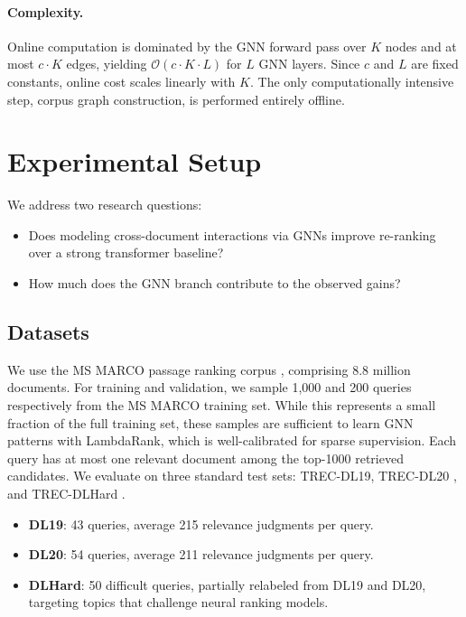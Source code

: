 \documentclass[runningheads]{llncs}
\begin{document}
\paragraph{Complexity.} Online computation is dominated by the GNN forward pass over $K$ nodes and at most $c \cdot K$ edges, yielding $\mathcal{O}(c \cdot K \cdot L)$ for $L$ GNN layers. Since $c$ and $L$ are fixed constants, online cost scales linearly with $K$. The only computationally intensive step, corpus graph construction, is performed entirely offline.


\section{Experimental Setup}
We address two research questions:
\begin{itemize}[leftmargin=1.1cm]
\item[\textbf{RQ1.}] Does modeling cross-document interactions via GNNs improve re-ranking over a strong transformer baseline?

\item[\textbf{RQ2.}] How much does the GNN branch contribute to the observed gains?
\end{itemize}

\subsection{Datasets}
We use the MS MARCO passage ranking corpus \cite{msmarco}, comprising 8.8 million documents. For training and validation, we sample 1,000 and 200 queries respectively from the MS MARCO training set. While this represents a small fraction of the full training set, these samples are sufficient to learn GNN patterns with LambdaRank\cite{lambdarank}, which is well-calibrated for sparse supervision. Each query has at most one relevant document among the top-1000 retrieved candidates. We evaluate on three standard test sets: TREC-DL19, TREC-DL20 \cite{dl19-20}, and TREC-DLHard \cite{dl-hard}.
\begin{itemize}
    \item \textbf{DL19}: 43 queries, average 215 relevance judgments per query.
    \item \textbf{DL20}: 54 queries, average 211 relevance judgments per query.
    \item \textbf{DLHard}: 50 difficult queries, partially relabeled from DL19 and DL20, targeting topics that challenge neural ranking models.
\end{itemize}
\end{document}
